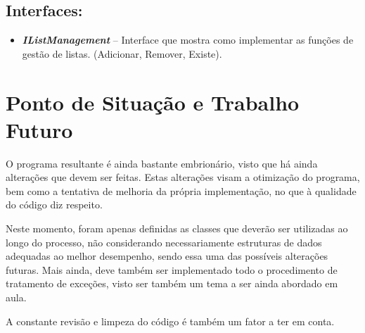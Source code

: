 \documentclass[
]{article}
\begin{document}
\hypertarget{interfaces}{%
\subsection{Interfaces:}\label{interfaces}}

\begin{itemize}
\item
  \emph{\textbf{IListManagement}} -- Interface que mostra como
  implementar as funções de gestão de listas. (Adicionar, Remover,
  Existe).
\end{itemize}

\hypertarget{ponto-de-situauxe7uxe3o-e-trabalho-futuro}{%
\section{\texorpdfstring{Ponto de Situação e Trabalho Futuro
}{Ponto de Situação e Trabalho Futuro }}\label{ponto-de-situauxe7uxe3o-e-trabalho-futuro}}

O programa resultante é ainda bastante embrionário, visto que há ainda
alterações que devem ser feitas. Estas alterações visam a otimização do
programa, bem como a tentativa de melhoria da própria implementação, no
que à qualidade do código diz respeito.

Neste momento, foram apenas definidas as classes que deverão ser
utilizadas ao longo do processo, não considerando necessariamente
estruturas de dados adequadas ao melhor desempenho, sendo essa uma das
possíveis alterações futuras. Mais ainda, deve também ser implementado
todo o procedimento de tratamento de exceções, visto ser também um tema
a ser ainda abordado em aula.

A constante revisão e limpeza do código é também um fator a ter em
conta.
\end{document}
